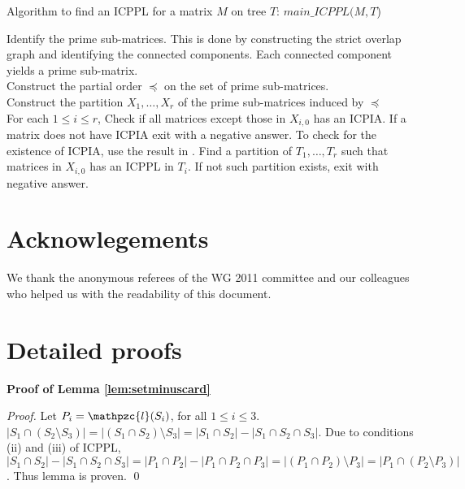 \documentclass[a4paper,UKenglish,numberwithinsect]{lipics}
\def\cl{\mathpzc{l}}
\begin{document}
\begin{algorithm}[h]
\caption{Algorithm to find an ICPPL for a matrix $M$ on tree $T$: $main\_ICPPL(M, T$)}
\label{Al:icppa-main}
\begin{algorithmic}
\STATE Identify the prime sub-matrices. This is done by constructing
the strict overlap graph and identifying the connected components. Each
connected component yields a prime sub-matrix.   \\ 
\STATE Construct the partial order $\preccurlyeq$ on the set of prime
sub-matrices.  \\ 
\STATE Construct the partition $X_1,\ldots,X_r$ of the  prime
sub-matrices induced by $\preccurlyeq$ \\
\STATE For each $1 \leq i \leq r$, Check if all matrices except those
in $X_{i,0}$ has an ICPIA.  If a matrix does not have ICPIA exit with
a negative answer.  To check for the existence of ICPIA, use the
result in \cite{nsnrs09}. 
\label{l:icppasubtree} \STATE  Find a partition of $T_1, \ldots, T_r$ such that matrices in
$X_{i,0}$ has an ICPPL in $T_i$.  If not such 
partition exists, exit with negative answer.  
\end{algorithmic}
\end{algorithm}




\section {Acknowlegements} 
We thank the anonymous referees of the WG 2011 committee and our
colleagues who helped us with the readability of this document.


%




\pagebreak
\appendix

\section{Detailed proofs}
{\bf Proof of Lemma \ref{lem:setminuscard}}\\
\begin{proof}
  Let $P_i = \cl(S_i)$, for all $1 \le i \le  3$.
  $|S_1 \cap (S_2 \setminus S_3)| = |(S_1 \cap S_2) \setminus S_3| =
  |S_1 \cap S_2| - |S_1 \cap S_2 \cap S_3|$. Due to conditions (ii)
  and (iii) of ICPPL, $|S_1 \cap S_2| - |S_1 \cap S_2 \cap S_3| = |P_1
  \cap P_2| - |P_1 \cap P_2 \cap P_3| = |(P_1 \cap P_2) \setminus P_3|
  = |P_1 \cap (P_2 \setminus P_3)|$. Thus lemma is proven. \qed
\end{proof}
\end{document}

